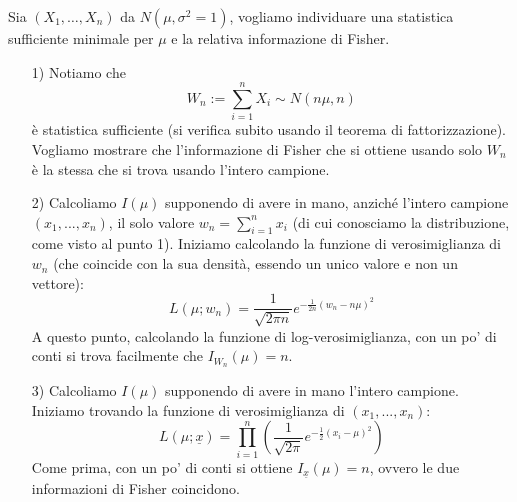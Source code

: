 \begin{esempio} Sia $(X_1,\ldots,X_n)$ da $N(\mu,\sigma^2=1)$, vogliamo individuare una statistica sufficiente minimale per $\mu$ e la relativa informazione di Fisher.
\begin{enumerate}
\item[1)] Notiamo che 
$$W_n:=\sum_{i=1}^n X_i \sim N(n\mu,n)$$
è statistica sufficiente (si verifica subito usando il teorema di fattorizzazione).\\
Vogliamo mostrare che l'informazione di Fisher che si ottiene usando solo $W_n$ è la stessa che si trova usando l'intero campione.
\item[2)] Calcoliamo $I(\mu)$ supponendo di avere in mano, anziché l'intero campione $(x_1,...,x_n)$, il solo valore $w_n=\sum_{i=1}^n x_i$ (di cui conosciamo la distribuzione, come visto al punto 1). Iniziamo calcolando la funzione di verosimiglianza di $w_n$ (che coincide con la sua densità, essendo un unico valore e non un vettore):
$$L(\mu; w_n)=\frac{1}{\sqrt{2 \pi n}} e^{-\frac{1}{2n} (w_n-n\mu)^2}$$
A questo punto, calcolando la funzione di log-verosimiglianza, con un po' di conti si trova facilmente che $I_{W_n}(\mu)=n$.
\item[3)] Calcoliamo $I(\mu)$ supponendo di avere in mano l'intero campione. Iniziamo trovando la funzione di verosimiglianza di $(x_1,...,x_n)$:
$$L(\mu; \underline{x})= \prod_{i=1}^n \left( \frac{1}{\sqrt{2 \pi}} e^{-\frac{1}{2}(x_i-\mu)^2} \right)$$
Come prima, con un po' di conti si ottiene $I_{\underline{x}}(\mu)=n$, ovvero le due informazioni di Fisher coincidono.
\\
\\
\end{enumerate}
\end{esempio}